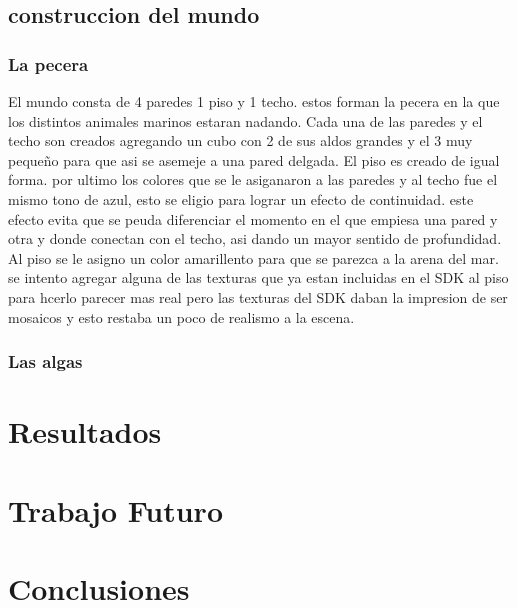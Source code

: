 \documentclass[10pt, a4paper, twocolumn]{article}
\begin{document}
\subsection{construccion del mundo}
\subsubsection{La pecera}

El mundo consta de 4 paredes 1 piso y 1 techo. estos forman la pecera en la que los distintos animales marinos estaran nadando.
Cada una de las paredes y el techo son creados agregando un cubo con 2 de sus aldos grandes y el 3 muy pequeño para que asi se asemeje a una pared delgada. El piso es creado de igual forma. por ultimo los colores que se le asiganaron a las paredes y al techo fue el mismo tono de azul, esto se eligio para lograr un efecto de continuidad. este efecto evita que se peuda diferenciar el momento en el que empiesa una pared y otra y donde conectan con el techo, asi dando un mayor sentido de profundidad.
Al piso se le asigno un color amarillento para que se parezca a la arena del mar. 
se intento agregar alguna de las texturas que ya estan incluidas en el SDK al piso para hcerlo parecer mas real pero las texturas del SDK daban la impresion de ser mosaicos y esto restaba un poco de realismo a la escena.  

\subsubsection{Las algas}



\section{Resultados}

\section{Trabajo Futuro}

\section{Conclusiones}

\printbibliography[{title = "example.bib" }] %

\end{document}
